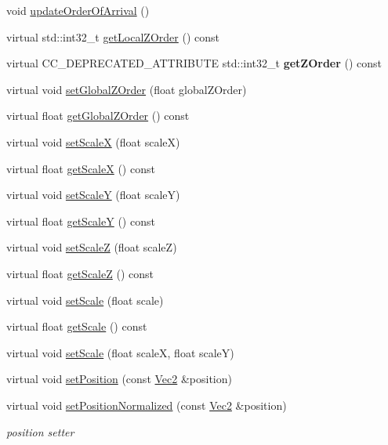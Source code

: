 \begin{Indent}
\begin{DoxyCompactItemize}
\item 
void \hyperlink{classNode_a75318d1418261ae7e8856ba2868b5a81}{update\+Order\+Of\+Arrival} ()
\item 
virtual std\+::int32\+\_\+t \hyperlink{classNode_a03f41047bd53b12c645a429246e31ea4}{get\+Local\+Z\+Order} () const
\item 
\mbox{\label{classNode_a8121dfe765cf4cb25ba7c8ca2c5fc741}} 
virtual C\+C\+\_\+\+D\+E\+P\+R\+E\+C\+A\+T\+E\+D\+\_\+\+A\+T\+T\+R\+I\+B\+U\+TE std\+::int32\+\_\+t {\bfseries get\+Z\+Order} () const
\item 
virtual void \hyperlink{classNode_aad45bcba0411770b5ef88f5409d06bb2}{set\+Global\+Z\+Order} (float global\+Z\+Order)
\item 
virtual float \hyperlink{classNode_afa5a7920169dbe5f21a59029bb04c166}{get\+Global\+Z\+Order} () const
\item 
virtual void \hyperlink{classNode_a49f8182769547584d8d7297b7a946da4}{set\+ScaleX} (float scaleX)
\item 
virtual float \hyperlink{classNode_a3ef411875aa6c675e72de13f91235694}{get\+ScaleX} () const
\item 
virtual void \hyperlink{classNode_af464e6b40bc036450fed05f8c74103e7}{set\+ScaleY} (float scaleY)
\item 
virtual float \hyperlink{classNode_a634136734ab9cce2a3797a621b788c68}{get\+ScaleY} () const
\item 
virtual void \hyperlink{classNode_aeaafb9dc116fdf029f51c7d3e6011a7f}{set\+ScaleZ} (float scaleZ)
\item 
virtual float \hyperlink{classNode_aac40998528bbad71f1aca2cfab032aca}{get\+ScaleZ} () const
\item 
virtual void \hyperlink{classNode_a666da31a8bf7f106409ea8aef707f215}{set\+Scale} (float scale)
\item 
virtual float \hyperlink{classNode_af8a6e8e0d7cc140bf3aa55b5898d8f5d}{get\+Scale} () const
\item 
virtual void \hyperlink{classNode_a4a3e5ab7d2a14b166ba539f0db9010e3}{set\+Scale} (float scaleX, float scaleY)
\item 
virtual void \hyperlink{classNode_a63f9ed194c372246c8018222d303faa7}{set\+Position} (const \hyperlink{classVec2}{Vec2} \&position)
\item 
virtual void \hyperlink{classNode_a4014e9c3840ed79bf9e5b5193e1f1a4b}{set\+Position\+Normalized} (const \hyperlink{classVec2}{Vec2} \&position)
\begin{DoxyCompactList}\small\item\em position setter \end{DoxyCompactList}\item 

\end{DoxyCompactItemize}
\end{Indent}
